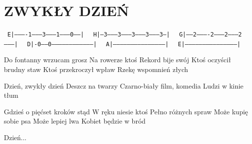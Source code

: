\documentclass[../../../songbook.tex]{subfiles}
\begin{document}
\TabPositions{8cm} %
\section*{ZWYKŁY DZIEŃ}
{}
\vspace{0.5cm}
 \texttt{ E|----------1--------3--------1--------0------|	}	\newline
 \texttt{ H|---3---------3--------3--------3--------3---|	}	\newline
 \texttt{ G|-----2----------2--------2--------2---------|	}	\newline
 \texttt{ D|-0-----0------------------------------------|	}	\newline
 \texttt{ A|--------------------------------------------|	}	\newline
 \texttt{ E|--------------------------------------------|	}	\newline

Do fontanny wrzucam grosz		 \newline	
Na rowerze ktoś 				 \newline	
Rekord bije swój				 \newline	
Ktoś oczyścił brudny staw			 \newline
Ktoś przekroczył wpław			 \newline
Rzekę wspomnień złych			 \newline

\-\hspace{1cm} Dzień, zwykły dzień				 \newline		
\-\hspace{1cm} Deszcz na twarzy			 \newline
\-\hspace{1cm} Czarno-biały film, komedia		 \newline	
\-\hspace{1cm} Ludzi w kinie tłum				 \newline	

Gdzieś o pięćset kroków stąd		 \newline
W ręku niesie ktoś					 \newline
Pełno różnych spraw				 \newline
Może kupię sobie psa				 \newline
Może lepiej lwa				 \newline
Kobiet będzie w bród				 \newline

\-\hspace{1cm} Dzień...				 \newline
\end{document}
